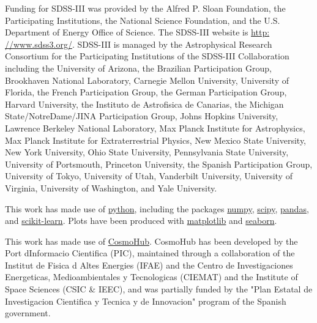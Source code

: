 \documentclass[fleqn,usenatbib,useAMS]{mnras}
\begin{document}
Funding for SDSS-III was provided by the Alfred P.
Sloan Foundation, the Participating Institutions, the National Science Foundation, and the U.S. Department of
Energy Office of Science. The SDSS-III website is \hyperlink{http:
//www.sdss3.org/}{http:
//www.sdss3.org/}. SDSS-III is managed by the Astrophysical Research Consortium for the Participating Institutions
of the SDSS-III Collaboration including the University of
Arizona, the Brazilian Participation Group, Brookhaven
National Laboratory, Carnegie Mellon University, University of Florida, the French Participation Group, the German Participation Group, Harvard University, the Instituto de Astrofisica de Canarias, the Michigan State/NotreDame/JINA Participation Group, Johns Hopkins University, Lawrence Berkeley National Laboratory, Max Planck
Institute for Astrophysics, Max Planck Institute for Extraterrestrial Physics, New Mexico State University, New
York University, Ohio State University, Pennsylvania State
University, University of Portsmouth, Princeton University,
the Spanish Participation Group, University of Tokyo, University of Utah, Vanderbilt University, University of Virginia, University of Washington, and Yale University.

This work has made use of \hyperlink{www.python.org}{python},
including the packages \hyperlink{www.numpy.org}{numpy}, \hyperlink{www.scipy.org}{scipy}, \hyperlink{https://pandas.pydata.org/}{pandas}, and \hyperlink{https://scikit-learn.org/}{scikit-learn}. 
Plots have been produced with \hyperlink{matplotlib.org}{matplotlib} and \hyperlink{https://seaborn.pydata.org/}{seaborn}.

This work has made use of \hyperlink{cosmohub.pic.es}{CosmoHub}.
CosmoHub has been developed by the Port dInformacio Cientifica (PIC), maintained through a collaboration of the Institut de Fisica d Altes Energies (IFAE) and the Centro de Investigaciones Energeticas, Medioambientales y Tecnologicas (CIEMAT) and the Institute of Space Sciences (CSIC \& IEEC), and was partially funded by the "Plan Estatal de Investigacion Cientifica y Tecnica y de Innovacion" program of the Spanish government.

 
\end{document}
